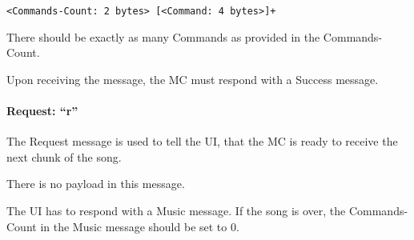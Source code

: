 \begin{verbatim}
<Commands-Count: 2 bytes> [<Command: 4 bytes>]+
\end{verbatim}

There should be exactly as many Commands as provided in the Commands-Count.

Upon receiving the message, the MC must respond with a Success message.

\paragraph{Request: \enquote{r}}

The Request message is used to tell the UI, that the MC is ready to receive the next chunk of the song.

There is no payload in this message.

The UI has to respond with a Music message. If the song is over, the Commands-Count in the Music message should be set to 0.